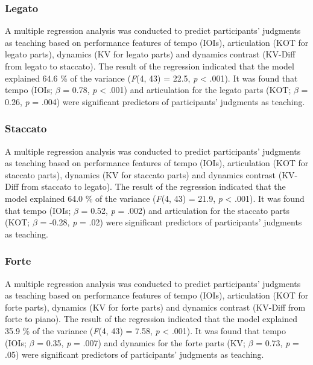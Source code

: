 \documentclass[
  man,floatsintext]{apa6}
\begin{document}
\hypertarget{legato}{%
\subsubsection{Legato}\label{legato}}

A multiple regression analysis was conducted to predict participants' judgments as teaching based on performance features of tempo (IOIs), articulation (KOT for legato parts), dynamics (KV for legato parts) and dynamics contrast (KV-Diff from legato to staccato). The result of the regression indicated that the model explained 64.6 \% of the variance (\emph{F}(4, 43) = 22.5, \emph{p} \textless{} .001). It was found that tempo (IOIs; \emph{\(\beta\)} = 0.78, \emph{p} \textless{} .001) and articulation for the legato parts (KOT; \emph{\(\beta\)} = 0.26, \emph{p} = .004) were significant predictors of participants' judgments as teaching.

\hypertarget{staccato}{%
\subsubsection{Staccato}\label{staccato}}

A multiple regression analysis was conducted to predict participants' judgments as teaching based on performance features of tempo (IOIs), articulation (KOT for staccato parts), dynamics (KV for staccato parts) and dynamics contrast (KV-Diff from staccato to legato). The result of the regression indicated that the model explained 64.0 \% of the variance (\emph{F}(4, 43) = 21.9, \emph{p} \textless{} .001). It was found that tempo (IOIs; \emph{\(\beta\)} = 0.52, \emph{p} = .002) and articulation for the staccato parts (KOT; \emph{\(\beta\)} = -0.28, \emph{p} = .02) were significant predictors of participants' judgments as teaching.

\hypertarget{forte}{%
\subsubsection{Forte}\label{forte}}

A multiple regression analysis was conducted to predict participants' judgments as teaching based on performance features of tempo (IOIs), articulation (KOT for forte parts), dynamics (KV for forte parts) and dynamics contrast (KV-Diff from forte to piano). The result of the regression indicated that the model explained 35.9 \% of the variance (\emph{F}(4, 43) = 7.58, \emph{p} \textless{} .001). It was found that tempo (IOIs; \emph{\(\beta\)} = 0.35, \emph{p} = .007) and dynamics for the forte parts (KV; \emph{\(\beta\)} = 0.73, \emph{p} = .05) were significant predictors of participants' judgments as teaching.
\end{document}
